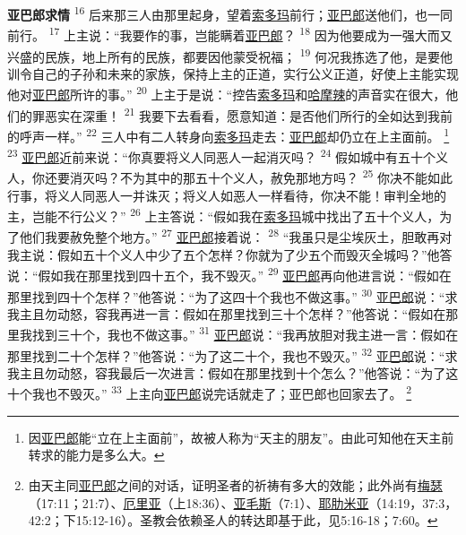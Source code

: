 \textbf{亚巴郎求情\quad}
\textsuperscript{16}
后来那三人由那里起身，望着\uline{索多玛}前行；\uline{亚巴郎}送他们，也一同前行。
\textsuperscript{17}
上主说：“我要作的事，岂能瞒着\uline{亚巴郎}？
\textsuperscript{18}
因为他要成为一强大而又兴盛的民族，地上所有的民族，都要因他蒙受祝福；
\textsuperscript{19}
何况我拣选了他，是要他训令自己的子孙和未来的家族，保持上主的正道，实行公义正道，好使上主能实现他对\uline{亚巴郎}所许的事。”
\textsuperscript{20}
上主于是说：“控告\uline{索多玛}和\uline{哈摩辣}的声音实在很大，他们的罪恶实在深重！
\textsuperscript{21}
我要下去看看，愿意知道：是否他们所行的全如达到我前的呼声一样。”
\textsuperscript{22}
三人中有二人转身向\uline{索多玛}走去：\uline{亚巴郎}却仍立在上主面前。
\footnote{因\uline{亚巴郎}能“立在上主面前”，故被人称为“天主的朋友”。由此可知他在天主前转求的能力是多么大。}
\textsuperscript{23}
\uline{亚巴郎}近前来说：“你真要将义人同恶人一起消灭吗？
\textsuperscript{24}
假如城中有五十个义人，你还要消灭吗？不为其中的那五十个义人，赦免那地方吗？
\textsuperscript{25}
你决不能如此行事，将义人同恶人一并诛灭；将义人如恶人一样看待，你决不能！审判全地的主，岂能不行公义？”
\textsuperscript{26}
上主答说：“假如我在\uline{索多玛}城中找出了五十个义人，为了他们我要赦免整个地方。”
\textsuperscript{27}
\uline{亚巴郎}接着说：
\textsuperscript{28}
“我虽只是尘埃灰土，胆敢再对我主说：假如五十个义人中少了五个怎样？你就为了少五个而毁灭全城吗？”他答说：“假如我在那里找到四十五个，我不毁灭。”
\textsuperscript{29}
\uline{亚巴郎}再向他进言说：“假如在那里找到四十个怎样？”他答说：“为了这四十个我也不做这事。”
\textsuperscript{30}
\uline{亚巴郎}说：“求我主且勿动怒，容我再进一言：假如在那里找到三十个怎样？”他答说：“假如在那里我找到三十个，我也不做这事。”
\textsuperscript{31}
\uline{亚巴郎}说：“我再放胆对我主进一言：假如在那里找到二十个怎样？”他答说：“为了这二十个，我也不毁灭。”
\textsuperscript{32}
\uline{亚巴郎}说：“求我主且勿动怒，容我最后一次进言：假如在那里找到十个怎么？”他答说：“为了这十个我也不毁灭。”
\textsuperscript{33}
上主向\uline{亚巴郎}说完话就走了；亚巴郎也回家去了。
\footnote{由天主同\uline{亚巴郎}之间的对话，证明圣者的祈祷有多大的效能；此外尚有\uline{梅瑟}（17:11；21:7）、\uline{厄里亚}（上18:36）、\uline{亚毛斯}（7:1）、\uline{耶肋米亚}（14:19，37:3，42:2；下15:12-16）。圣教会依赖圣人的转达即基于此，见5:16-18；7:60。}

